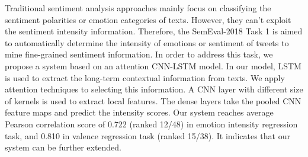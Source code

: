 Traditional sentiment analysis approaches mainly focus on classifying the sentiment polarities or emotion categories of texts. However, they can't exploit the sentiment intensity information. Therefore, the SemEval-2018 Task 1 is aimed to automatically determine the intensity of emotions or sentiment of tweets to mine fine-grained sentiment information. In order to address this task, we propose a system based on an attention CNN-LSTM model. In our model, LSTM is used to extract the long-term contextual information from texts. We apply attention techniques to selecting this information. A CNN layer with different size of kernels is used to extract local features. The dense layers take the pooled CNN feature maps and predict the intensity scores. Our system reaches average Pearson correlation score of 0.722 (ranked 12/48) in emotion intensity regression task, and 0.810 in valence regression task (ranked 15/38). It indicates that our system can be further extended.
